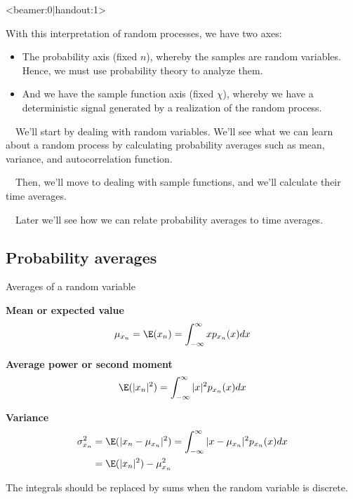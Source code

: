 \documentclass[10pt, aspectratio=169]{beamer}
\begin{document}
\begin{frame}<beamer:0|handout:1>

With this interpretation of random processes, we have two axes:

\begin{itemize}
	\item The probability axis (fixed $n$), whereby the samples are random variables. Hence, we must use probability theory to analyze them.
	\item And we have the sample function axis (fixed $\chi$), whereby we have a deterministic signal generated by a realization of the random process. 
\end{itemize}

~~We'll start by dealing with random variables. We'll see what we can learn about a random process by calculating probability averages such as mean, variance, and autocorrelation function.

~~Then, we'll move to dealing with sample functions, and we'll calculate their time averages.

~~Later we'll see how we can relate probability averages to time averages.

\end{frame}

\subsection{Probability averages}
\begin{frame}{Averages of a random variable}

\textbf{Mean or expected value}
\begin{equation*}
	\mu_{x_n} = \E(x_n) = \int_{-\infty}^{\infty}xp_{x_n}(x)dx
\end{equation*}

\pause
\textbf{Average power or second moment}
\begin{equation*} 
	\E(|x_n|^2) = \int_{-\infty}^{\infty}|x|^2p_{x_n}(x)dx
\end{equation*}

\pause
\textbf{Variance}
\begin{align*}
\sigma^2_{x_n} &= \E(|x_n-\mu_{x_n}|^2) = \int_{-\infty}^{\infty}|x-\mu_{x_n}|^2p_{x_n}(x)dx \\
&= \E(|x_n|^2) - \mu_{x_n}^2
\end{align*}

The integrals should be replaced by sums when the random variable is discrete.

\end{frame}
\end{document}
